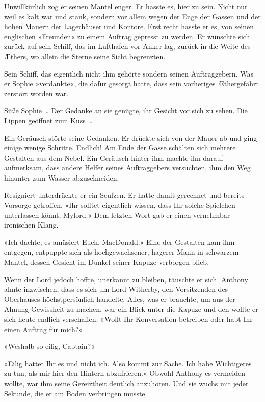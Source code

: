 Unwillkürlich zog er seinen Mantel enger. Er hasste es, hier zu
sein. Nicht nur weil es kalt war und stank, sondern vor allem wegen
der Enge der Gassen und der hohen Mauern der Lagerhäuser und
Kontore. Erst recht hasste er es, von seinen englischen »Freunden«
zu einem Auftrag gepresst zu werden. Er wünschte sich zurück auf
sein Schiff, das im Lufthafen vor Anker lag, zurück in die Weite
des Æthers, wo allein die Sterne seine Sicht begrenzten.

Sein Schiff, das eigentlich nicht ihm gehörte sondern seinen
Auftraggebern. Was er Sophie »verdankte«, die dafür gesorgt hatte,
dass sein vorheriges Æthergefährt zerstört worden war.

Süße Sophie … Der Gedanke an sie genügte, ihr Gesicht vor sich zu
sehen. Die Lippen geöffnet zum Kuss …

\bigpar

Ein Geräusch störte seine Gedanken. Er drückte sich von der Mauer
ab und ging einige wenige Schritte. Endlich! Am Ende der Gasse
schälten sich mehrere Gestalten aus dem Nebel. Ein Geräusch hinter
ihm machte ihn darauf aufmerksam, dass andere Helfer seines
Auftraggebers versuchten, ihm den Weg hinunter zum Wasser
abzuschneiden.

Resigniert unterdrückte er ein Seufzen. Er hatte damit gerechnet
und bereits Vorsorge getroffen. »Ihr solltet eigentlich wissen,
dass Ihr solche Spielchen unterlassen könnt, Mylord.« Dem letzten
Wort gab er einen vernehmbar ironischen Klang.

»Ich dachte, es amüsiert Euch, MacDonald.« Eine der Gestalten kam
ihm entgegen, entpuppte sich als hochgewachsener, hagerer Mann in
schwarzem Mantel, dessen Gesicht im Dunkel seiner Kapuze verborgen
blieb.

Wenn der Lord jedoch hoffte, unerkannt zu bleiben, täuschte er
sich. Anthony ahnte inzwischen, dass es sich um Lord Witherby, den
Vorsitzenden des Oberhauses höchstpersönlich handelte. Alles, was
er brauchte, um aus der Ahnung Gewissheit zu machen, war ein Blick
unter die Kapuze und den wollte er sich heute endlich verschaffen.
»Wollt Ihr Konversation betreiben oder habt Ihr einen Auftrag für
mich?«

»Weshalb so eilig, Captain?«

»Eilig hattet Ihr es und nicht ich. Also kommt zur Sache. Ich habe
Wichtigeres zu tun, als mir hier den Hintern abzufrieren.« Obwohl
Anthony es vermeiden wollte, war ihm seine Gereiztheit deutlich
anzuhören. Und sie wuchs mit jeder Sekunde, die er am Boden
verbringen musste.

